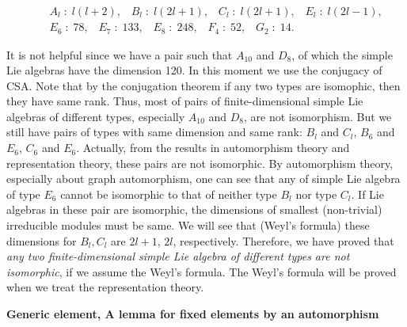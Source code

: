 \documentclass{article}
\begin{document}
\begin{eqnarray*}
  &\;& A_l \;:\; l(l + 2), \;\;\; B_l \;:\; l(2l + 1), \;\;\; C_l \;:\; l(2l + 1), \;\;\; E_l \;:\; l(2l - 1), \\
  &\;& E_6 \;:\; 78, \;\;\; E_7 \;:\; 133, \;\;\; E_8 \;:\; 248, \;\;\; F_4 \;:\; 52, \;\;\; G_2 \;:\; 14.
\end{eqnarray*}

It is not helpful since we have a pair such that $A_{10}$ and $D_8$, of which the simple Lie algebras have the dimension 120.
In this moment we use the conjugacy of CSA.
Note that by the conjugation theorem if any two types are isomophic, then they have same rank.
Thus, most of pairs of finite-dimensional simple Lie algebras of different types, especially $A_{10}$ and $D_8$, are not isomorphism.
But we still have pairs of types with same dimension and same rank: $B_l$ and $C_l$, $B_6$ and $E_6$, $C_6$ and $E_6$.
Actually, from the results in automorphism theory and representation theory, these pairs are not isomorphic.
By automorphism theory, especially about graph automorphism, one can see that any of simple Lie algebra of type $E_6$ cannot be isomorphic to that of neither type $B_l$ nor type $C_l$.
If Lie algebras in these pair are isomorphic, the dimensions of smallest (non-trivial) irreducible modules must be same.
We will see that (Weyl's formula) these dimensions for $B_l, C_l$ are $2l + 1$, $2l$, respectively.
Therefore, we have proved that \textit{any two finite-dimensional simple Lie algebra of different types are not isomorphic}, if we assume the Weyl's formula.
The Weyl's formula will be proved when we treat the representation theory.

\newpage

\textbf{Generic element, A lemma for fixed elements by an automorphism}
\end{document}
